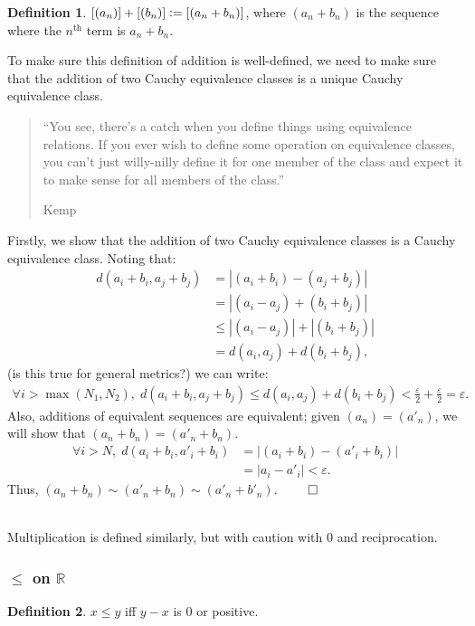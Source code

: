 \documentclass{article}
\theoremstyle{definition}
\newtheorem{defn}{Definition}[subsubsection]
\begin{document}
\begin{defn}
	$[(a_n)]+[(b_n)]\vcentcolon=[(a_n+b_n)]$, where $(a_n+b_n)$ is the sequence where the $n^\text{th}$ term is $a_n+b_n$.
\end{defn}
To make sure this definition of addition is well-defined, we need to make sure that the addition of two Cauchy equivalence classes is a unique Cauchy equivalence class.
\begin{quotation}
	``You see, there’s a catch when you define things using
equivalence relations. If you ever wish to define some operation on equivalence classes, you can’t
just willy-nilly define it for one member of the class and expect it to make sense for all members of
the class.''
	\begin{flushright}
		Kemp \cite[6]{Kemp2016CAUCHYSCO}
	\end{flushright}
\end{quotation}

Firstly, we show that the addition of two Cauchy equivalence classes is a Cauchy equivalence class. Noting that:
\begin{align*}
	d(a_i+b_i,a_j+b_j)&=|(a_i+b_i)-(a_j+b_j)|\\
	&=|(a_i-a_j)+(b_i+b_j)|\\
	&\leq|(a_i-a_j)|+|(b_i+b_j)|\\
	&=d(a_i,a_j)+d(b_i+b_j),
\end{align*}
(is this true for general metrics?) we can write:
\begin{align*}
	\forall i>\max(N_1,N_2),\; d(a_i+b_i,a_j+b_j)\leq d(a_i,a_j)+d(b_i+b_j)<\frac{\varepsilon}{2}+\frac{\varepsilon}{2}=\varepsilon.
\end{align*}
Also, additions of equivalent sequences are equivalent; given $(a_n)=(a'_n)$, we will show that $(a_n+b_n)=(a'_n+b_n)$.
\begin{align*}
	\forall i>N,\;d(a_i+b_i,a'_i+b_i)&=|(a_i+b_i)-(a'_i+b_i)|\\
	&=|a_i-a'_i|<\varepsilon.
\end{align*}
Thus, $(a_n+b_n)\sim(a'_n+b_n)\sim(a'_n+b'_n)$.\hspace*{\fill} \raggedleft$\qed$\raggedright\\
Multiplication is defined similarly, but with caution with 0 and reciprocation.
\subsubsection{\texorpdfstring{$\leq$}{leq} on \texorpdfstring{$\mathbb{R}$}{mathbb{R}}}
\begin{defn}
	$x\leq y$ iff $y-x$ is 0 or positive.
\end{defn}
\end{document}
